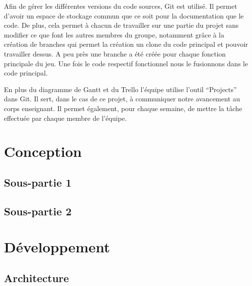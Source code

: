 \documentclass[a4paper,12pt]{article}
\begin{document}
Afin de gérer les différentes versions du code sources, Git est utilisé. 
Il permet d’avoir un espace de stockage commun que ce soit pour la documentation que le code. De plus, cela permet à chacun de travailler sur une partie du projet sans modifier ce que font les autres membres du groupe, notamment grâce à la création de branches qui permet la création un clone du code principal et pouvoir travailler dessus. 
A peu près une branche a été créée pour chaque fonction principale du jeu. Une fois le code respectif fonctionnel nous le fusionnons dans le code principal.

En plus du diagramme de Gantt et du Trello l’équipe utilise l’outil “Projects” dans Git. 
Il sert, dans le cas de ce projet, à communiquer notre avancement au corps enseignant. 
Il permet également, pour chaque semaine, de mettre la tâche effectuée par chaque membre de l’équipe.



\section{Conception}

\subsection{Sous-partie 1}

\subsection{Sous-partie 2}



\section{Développement}

\subsection{Architecture}
\end{document}
